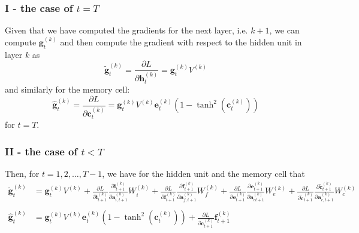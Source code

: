 \documentclass{article}
\begin{document}
\subsubsection*{I - the case of $t = T$}
	Given that we have computed the gradients for the next layer, i.e. $k+1$, we can compute $\bm{g}_t^{(k)}$ and then compute the gradient with respect to the hidden unit in layer $k$ as 
	$$\tilde{\bm{g}}_t^{(k)} = \frac{\partial L}{\partial \bm{h}_t^{(k)}} = \bm{g}_t^{(k)}V^{(k)}$$
	and similarly for the memory cell:
	$$\hat{\bm{g}}_t^{(k)} = \frac{\partial L}{\partial \bm{c}_t^{(k)}} = \bm{g}_t^{(k)} V^{(k)} \bm{e}_t^{(k)} (1 - \tanh^2(\bm{c}_t^{(k)}))$$
	for $t = T$. 

\subsubsection*{II - the case of $t < T$}
	Then, for $t = 1, 2, \dots, T-1$, we have for the hidden unit and the memory cell that
	\begin{align*}
	\tilde{\bm{g}}_t^{(k)} &= \bm{g}_t^{(k)} V^{(k)}  + \frac{\partial L}{\partial \bm{i}_{t+1}^{(k)}} \frac{\partial \bm{i}_{t+1}^{(k)}}{\partial \bm{a}_{i, t+1}^{(k)}} W_i^{(k)} + \frac{\partial L}{\partial \bm{f}_{t+1}^{(k)}}  \frac{\partial \bm{f}_{t+1}^{(k)}}{\partial \bm{a}_{f, t+1}^{(k)}}W_f^{(k)}  + \frac{\partial L}{\partial \bm{e}_{t+1}^{(k)}}  \frac{\partial \bm{e}_{t+1}^{(k)}}{\partial \bm{a}_{e t+1}^{(k)}}W_e^{(k)} + \frac{\partial L}{\partial \tilde{\bm{c}}_{t+1}^{(k)}}  \frac{\partial \tilde{\bm{c}}_{t+1}^{(k)}}{\partial \bm{a}_{c, t+1}^{(k)}}W_c^{(k)}\\\\
	\hat{\bm{g}}_t^{(k)} &= \bm{g}_t^{(k)} V^{(k)} \bm{e}_t^{(k)}(1 - \tanh^2(\bm{c}_t^{(k)})) + \frac{\partial L}{\partial \bm{c}_{t+1}^{(k)}} \bm{f}_{t+1}^{(k)}
	\end{align*}

	
	
\end{document}
